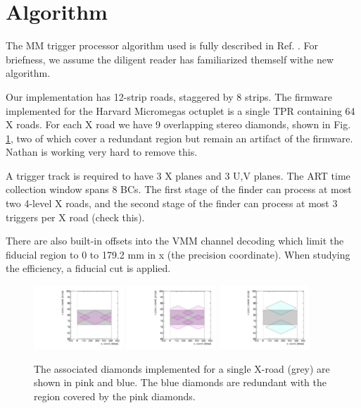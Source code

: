 \section{Algorithm}
The MM trigger processor algorithm used is fully described in Ref. \cite{tpsim}. For briefness, we assume the diligent reader has familiarized themself withe new algorithm. 
\par Our implementation has 12-strip roads, staggered by 8 strips. The firmware implemented for the Harvard Micromegas octuplet is a single TPR containing 64 X roads. For each X road we have 9 overlapping stereo diamonds, shown in Fig. \ref{fig:diamonds}, two of which cover a redundant region but remain an artifact of the firmware. Nathan is working very hard to remove this.
\par A trigger track is required to have 3 X planes and 3 U,V planes. The ART time collection window spans 8 BCs. The first stage of the finder can process at most two 4-level X roads, and the second stage of the finder can process at most 3 triggers per X road (check this).
\par There are also built-in offsets into the VMM channel decoding which limit the fiducial region to 0 to 179.2 mm in x (the precision coordinate). When studying the efficiency, a fiducial cut is applied.

\begin{figure}[!htpb]
  \begin{center}
    \includegraphics[width=0.3\textwidth]{figures/plot_horiz.pdf}
    \includegraphics[width=0.3\textwidth]{figures/plot_surround.pdf}
    \includegraphics[width=0.3\textwidth]{figures/plot_extra.pdf}
  \end{center}
  \vspace{-10pt}
  \caption{The associated diamonds implemented for a single X-road (grey) are shown in pink and blue. The blue diamonds are redundant with the region covered by the pink diamonds.}
  \label{fig:diamonds}
\end{figure}



